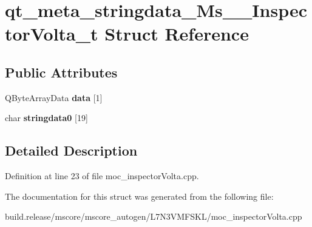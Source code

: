 \hypertarget{structqt__meta__stringdata___ms_____inspector_volta__t}{}\section{qt\+\_\+meta\+\_\+stringdata\+\_\+\+Ms\+\_\+\+\_\+\+Inspector\+Volta\+\_\+t Struct Reference}
\label{structqt__meta__stringdata___ms_____inspector_volta__t}
\subsection*{Public Attributes}
\begin{DoxyCompactItemize}
\item 
\mbox{\label{structqt__meta__stringdata___ms_____inspector_volta__t_a8b8a7f8071596251d6c9cb12f4dc5395}} 
Q\+Byte\+Array\+Data {\bfseries data} \mbox{[}1\mbox{]}
\item 
\mbox{\label{structqt__meta__stringdata___ms_____inspector_volta__t_ae287c1c9c492a773168ff1a062c644aa}} 
char {\bfseries stringdata0} \mbox{[}19\mbox{]}
\end{DoxyCompactItemize}


\subsection{Detailed Description}


Definition at line 23 of file moc\+\_\+inspector\+Volta.\+cpp.



The documentation for this struct was generated from the following file\+:\begin{DoxyCompactItemize}
\item 
build.\+release/mscore/mscore\+\_\+autogen/\+L7\+N3\+V\+M\+F\+S\+K\+L/moc\+\_\+inspector\+Volta.\+cpp\end{DoxyCompactItemize}
